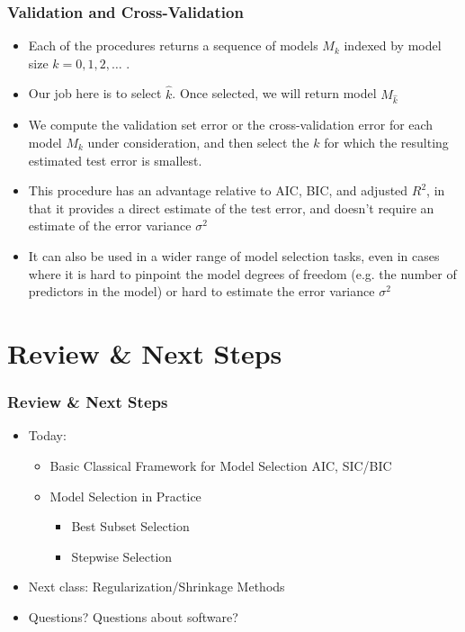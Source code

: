 \documentclass[
  shownotes,
  xcolor={svgnames},
  hyperref={colorlinks,citecolor=DarkBlue,linkcolor=DarkRed,urlcolor=DarkBlue}
  ]{beamer}
\begin{document}
\begin{frame}[fragile]
\frametitle{Validation and Cross-Validation}

\begin{itemize}
\item Each of the procedures returns a sequence of models $M_k$ indexed by model size $k = 0,1,2,\dots$ .
\item Our job here is to select $\hat k$. Once selected, we will return model $M_{\hat{k}}$
\item We compute the validation set error or the cross-validation error for each model $M_k$ under consideration, and then select the $k$ for which the resulting estimated test error is smallest.
\item This procedure has an advantage relative to AIC, BIC, and adjusted $R^2$, in that it provides a direct estimate of the test error, and doesn't require an estimate of the error variance $\sigma^2$
\item It can also be used in a wider range of model selection tasks, even in cases where it is hard to pinpoint the model degrees of freedom (e.g. the number of predictors in the model) or hard to estimate the error variance $\sigma^2$ 
\end{itemize}
\end{frame}


\section{Review \& Next Steps}
\begin{frame}
\frametitle{Review \& Next Steps}
  
\begin{itemize} 
    \item Today:
    \medskip
    \begin{itemize} 
      \item Basic Classical Framework for Model Selection AIC, SIC/BIC
      \medskip
      \item Model Selection in Practice  
        \begin{itemize}  
            \item Best Subset Selection
            \medskip
            \item Stepwise Selection
        \end{itemize}
    \end{itemize}
  	\bigskip  
	\item  Next class:  Regularization/Shrinkage Methods


\bigskip  
\item Questions? Questions about software? 

\end{itemize}
\end{frame}
\end{document}
